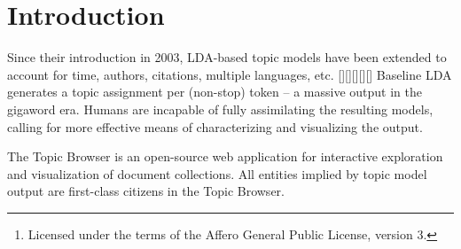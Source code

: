 \date{}


\maketitle


\begin{abstract}
The Topic Browser is an open-source\footnote{Licensed under the terms of the
Affero General Public License, version 3.}  web application for interactive
exploration and visualization of topics and documents. Mallet LDA output is used
as input. We explain why such a tool is warranted, what it is capable of, and
how to use it to explore the corpus (or topic model) of your choice.
\end{abstract}

\section{Introduction}
Since their introduction in 2003, LDA-based topic models have been extended to
account for time, authors, citations, multiple languages, etc. [][][][][]
Baseline LDA generates a topic assignment per (non-stop) token -- a massive
output in the gigaword era. Humans are incapable of fully assimilating the
resulting models, calling for more effective means of characterizing and
visualizing the output.

The Topic Browser is an open-source web application for interactive exploration
and visualization of document collections. All entities implied by topic model output are first-class citizens in the Topic
Browser. 


